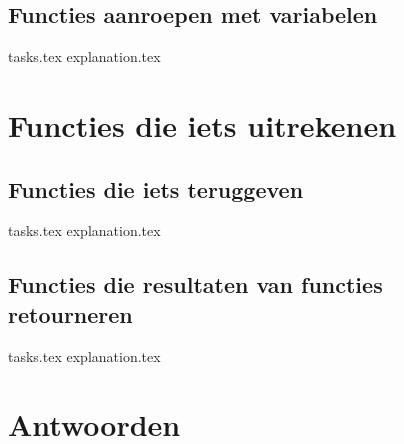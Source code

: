     \section{Functies aanroepen met variabelen}
    {tasks.tex}         \newpage
    {explanation.tex}      \newpage

    \chapter{Functies die iets uitrekenen}
    \newpage



    \section{Functies die iets teruggeven}
    {tasks.tex}            \newpage
    {explanation.tex}         \newpage

    \section{Functies die resultaten van functies retourneren}
    {tasks.tex}             \newpage
    {explanation.tex}          \newpage

    \chapter*{Antwoorden}
    \printsolutions[headings-template=collection]


